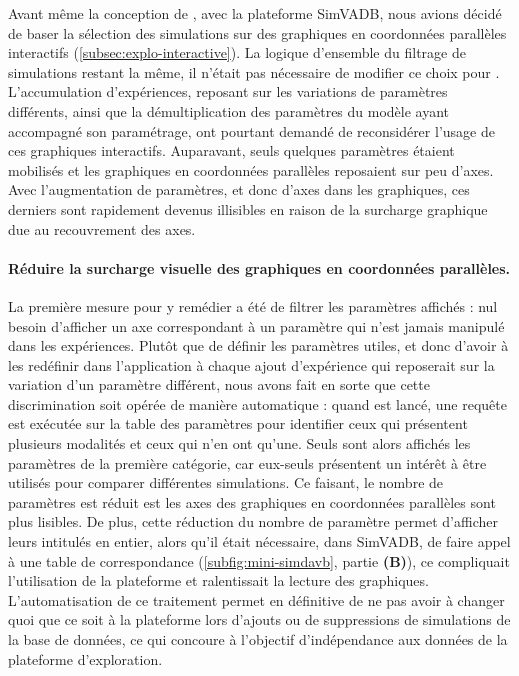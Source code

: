 Avant même la conception de \simedb{}, avec la plateforme SimVADB, nous avions décidé de baser la sélection des simulations sur des graphiques en coordonnées parallèles interactifs (\cref{subsec:explo-interactive}).
La logique d'ensemble du filtrage de simulations restant la même, il n'était pas nécessaire de modifier ce choix pour \simedb{}.
L'accumulation d'expériences, reposant sur les variations de paramètres différents, ainsi que la démultiplication des paramètres du modèle \simfeodal{} ayant accompagné son paramétrage, ont pourtant demandé de reconsidérer l'usage de ces graphiques interactifs.
Auparavant, seuls quelques paramètres étaient mobilisés et les graphiques en coordonnées parallèles reposaient sur peu d'axes.
Avec l'augmentation de paramètres, et donc d'axes dans les graphiques, ces derniers sont rapidement devenus illisibles en raison de la surcharge graphique due au recouvrement des axes.

\paragraph{Réduire la surcharge visuelle des graphiques en coordonnées parallèles.}

La première mesure pour y remédier a été de filtrer les paramètres affichés : nul besoin d'afficher un axe correspondant à un paramètre qui n'est jamais manipulé dans les expériences.
Plutôt que de définir les paramètres \og utiles\fg{}, et donc d'avoir à les redéfinir dans l'application à chaque ajout d'expérience qui reposerait sur la variation d'un paramètre différent, nous avons fait en sorte que cette discrimination soit opérée de manière automatique :
quand \simedb{} est lancé, une requête est exécutée sur la table des paramètres pour identifier ceux qui présentent plusieurs modalités et ceux qui n'en ont qu'une.
Seuls sont alors affichés les paramètres de la première catégorie, car eux-seuls présentent un intérêt à être utilisés pour comparer différentes simulations.
Ce faisant, le nombre de paramètres est réduit est les axes des graphiques en coordonnées parallèles sont plus lisibles.
De plus, cette réduction du nombre de paramètre permet d'afficher leurs intitulés en entier, alors qu'il était nécessaire, dans SimVADB, de faire appel à une table de correspondance (\cref{subfig:mini-simdavb}, partie \textbf{(B)}), ce compliquait l'utilisation de la plateforme et ralentissait la lecture des graphiques.
L'automatisation de ce traitement permet en définitive de ne pas avoir à changer quoi que ce soit à la plateforme lors d'ajouts ou de suppressions de simulations de la base de données, ce qui concoure à l'objectif d'indépendance aux données de la plateforme d'exploration.

